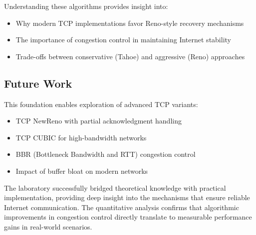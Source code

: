 \documentclass[12pt]{article}
\begin{document}
Understanding these algorithms provides insight into:
\begin{itemize}
    \item Why modern TCP implementations favor Reno-style recovery mechanisms
    \item The importance of congestion control in maintaining Internet stability
    \item Trade-offs between conservative (Tahoe) and aggressive (Reno) approaches
\end{itemize}

\subsection{Future Work}

This foundation enables exploration of advanced TCP variants:
\begin{itemize}
    \item TCP NewReno with partial acknowledgment handling
    \item TCP CUBIC for high-bandwidth networks
    \item BBR (Bottleneck Bandwidth and RTT) congestion control
    \item Impact of buffer bloat on modern networks
\end{itemize}

The laboratory successfully bridged theoretical knowledge with practical implementation, providing deep insight into the mechanisms that ensure reliable Internet communication. The quantitative analysis confirms that algorithmic improvements in congestion control directly translate to measurable performance gains in real-world scenarios.
\end{document}
